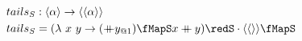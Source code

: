 \documentclass[preview]{standalone}
\begin{document}
\begin{align*}
  tails_S &: \vect{\alpha} \rightarrow \vect{\vect{\alpha}} \\
  tails_S & = (\lambda\ x\ y \rightarrow (\fcat y_{@1}) \fMapS x \fcat y) \redS \cdot \vect{\vect{}} \fMapS
\end{align*}
\end{document}
